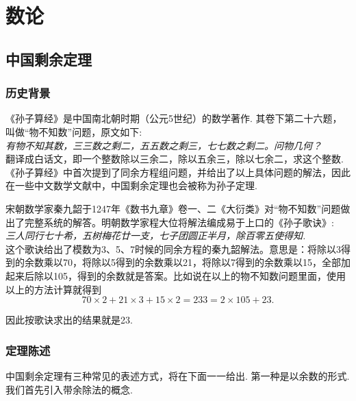 \documentclass[color=green,mathpazo,titlestyle=hang]{elegantbook}
\author{Huyi Chen}
\begin{document}
\maketitle
\tableofcontents
\mainmatter

\chapter{数论}

\section{中国剩余定理}

\subsection{历史背景}
《孙子算经》是中国南北朝时期（公元5世纪）的数学著作\cite{szsj}. 其卷下第二十六题，叫做“物不知数”问题，原文如下:\\ 

\emph{有物不知其数，三三数之剩二，五五数之剩三，七七数之剩二。问物几何？}\\ 


翻译成白话文，即一个整数除以三余二，除以五余三，除以七余二，求这个整数.《孙子算经》中首次提到了同余方程组问题，并给出了以上具体问题的解法，因此在一些中文数学文献中，中国剩余定理也会被称为孙子定理.

宋朝数学家秦九韶于1247年《数书九章》卷一、二《大衍类》对“物不知数”问题做出了完整系统的解答。明朝数学家程大位将解法编成易于上口的《孙子歌诀》\cite{szgj}:\\ 

\emph{三人同行七十希，五树梅花廿一支，七子团圆正半月，除百零五使得知.}\\

这个歌诀给出了模数为3、5、7时候的同余方程的秦九韶解法。意思是：将除以3得到的余数乘以70，将除以5得到的余数乘以21，将除以7得到的余数乘以15，全部加起来后除以105，得到的余数就是答案。比如说在以上的物不知数问题里面，使用以上的方法计算就得到
\[ 70\times 2+21\times 3+15\times 2=233=2\times 105+23.\] 

因此按歌诀求出的结果就是23.



\subsection{定理陈述}
  中国剩余定理有三种常见的表述方式，将在下面一一给出.
  第一种是以余数的形式.我们首先引入带余除法的概念.
  
\end{document}
